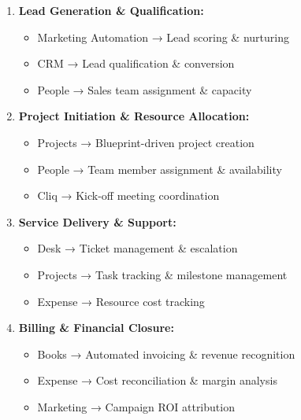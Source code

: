 \begin{enumerate}
\item \textbf{Lead Generation \& Qualification:}
  \begin{itemize}
    \item Marketing Automation → Lead scoring \& nurturing
    \item CRM → Lead qualification \& conversion
    \item People → Sales team assignment \& capacity
  \end{itemize}

\item \textbf{Project Initiation \& Resource Allocation:}
  \begin{itemize}
    \item Projects → Blueprint-driven project creation
    \item People → Team member assignment \& availability
    \item Cliq → Kick-off meeting coordination
  \end{itemize}

\item \textbf{Service Delivery \& Support:}
  \begin{itemize}
    \item Desk → Ticket management \& escalation
    \item Projects → Task tracking \& milestone management
    \item Expense → Resource cost tracking
  \end{itemize}

\item \textbf{Billing \& Financial Closure:}
  \begin{itemize}
    \item Books → Automated invoicing \& revenue recognition
    \item Expense → Cost reconciliation \& margin analysis
    \item Marketing → Campaign ROI attribution
  \end{itemize}
\end{enumerate}

